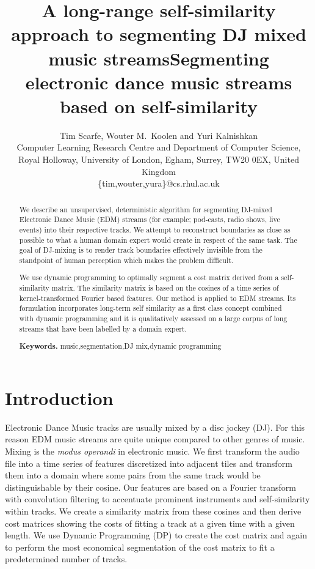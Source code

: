 \documentclass[twocolumn]{article}
\title{
	A long-range self-similarity approach to segmenting DJ mixed music streams}
\author{Tim Scarfe, Wouter M.~Koolen and Yuri Kalnishkan \\ 
	Computer Learning Research
	Centre and Department of Computer Science, \\ 
	Royal Holloway,  University of London, Egham, Surrey, TW20 0EX, United Kingdom\\
	\{tim,wouter,yura\}@cs.rhul.ac.uk
}
\title{Segmenting electronic dance music streams based on self-similarity}
\begin{document}
	
	\maketitle
	
	\begin{abstract}
		
		We describe an unsupervised, deterministic algorithm for segmenting DJ-mixed Electronic Dance Music (EDM) streams (for example; pod-casts, radio shows, live events) into their respective tracks. We attempt to reconstruct boundaries as close as possible to what a human domain expert would create in respect of the same task. The goal of DJ-mixing is to render track boundaries effectively invisible from the standpoint of human perception which makes the problem difficult.
		
		We use dynamic programming to optimally segment a cost matrix derived from a self-similarity matrix. The similarity matrix is based on the cosines of a time series of kernel-transformed Fourier based features. Our method is applied to EDM streams. Its formulation incorporates long-term self similarity as a first class concept combined with dynamic programming and it is qualitatively assessed on a large corpus of long streams that have been labelled by a domain expert.
		\smallskip
		
		\noindent \textbf{Keywords.} \noindent music,segmentation,DJ mix,dynamic programming
		
	\end{abstract}
	
	
	\vspace{1em}
	
	\section{Introduction}
	
	Electronic Dance Music tracks are usually mixed by a disc jockey (DJ). For this reason EDM music streams are quite unique compared to other genres of music. Mixing is the \textit{modus operandi} in electronic music. We first transform the audio file into a time series of features discretized into adjacent tiles and transform them into a domain where some pairs from the same track would be distinguishable by their cosine. Our features are based on a Fourier transform with convolution filtering to accentuate prominent instruments and self-similarity within tracks. We create a similarity matrix from these cosines and then derive cost matrices showing the costs of fitting a track at a given time with a given length. We use Dynamic Programming (DP) to create the cost matrix and again to perform the most economical segmentation of the cost matrix to fit a predetermined number of tracks.
	
\end{document}
